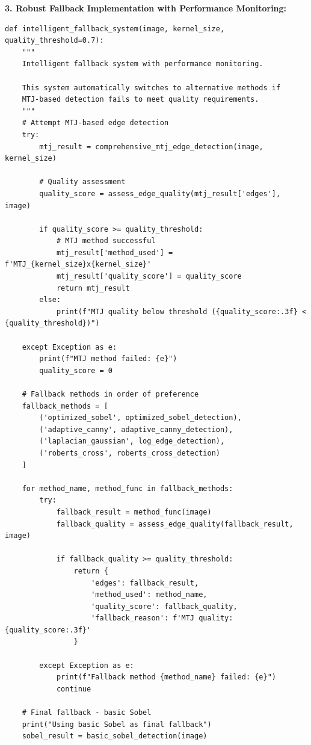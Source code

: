 \documentclass[conference]{IEEEtran}
\begin{document}
\textbf{3. Robust Fallback Implementation with Performance Monitoring:}
\begin{lstlisting}[caption={Intelligent fallback system with performance monitoring}]
def intelligent_fallback_system(image, kernel_size, quality_threshold=0.7):
    """
    Intelligent fallback system with performance monitoring.
    
    This system automatically switches to alternative methods if
    MTJ-based detection fails to meet quality requirements.
    """
    # Attempt MTJ-based edge detection
    try:
        mtj_result = comprehensive_mtj_edge_detection(image, kernel_size)
        
        # Quality assessment
        quality_score = assess_edge_quality(mtj_result['edges'], image)
        
        if quality_score >= quality_threshold:
            # MTJ method successful
            mtj_result['method_used'] = f'MTJ_{kernel_size}x{kernel_size}'
            mtj_result['quality_score'] = quality_score
            return mtj_result
        else:
            print(f"MTJ quality below threshold ({quality_score:.3f} < {quality_threshold})")
            
    except Exception as e:
        print(f"MTJ method failed: {e}")
        quality_score = 0
    
    # Fallback methods in order of preference
    fallback_methods = [
        ('optimized_sobel', optimized_sobel_detection),
        ('adaptive_canny', adaptive_canny_detection),
        ('laplacian_gaussian', log_edge_detection),
        ('roberts_cross', roberts_cross_detection)
    ]
    
    for method_name, method_func in fallback_methods:
        try:
            fallback_result = method_func(image)
            fallback_quality = assess_edge_quality(fallback_result, image)
            
            if fallback_quality >= quality_threshold:
                return {
                    'edges': fallback_result,
                    'method_used': method_name,
                    'quality_score': fallback_quality,
                    'fallback_reason': f'MTJ quality: {quality_score:.3f}'
                }
                
        except Exception as e:
            print(f"Fallback method {method_name} failed: {e}")
            continue
    
    # Final fallback - basic Sobel
    print("Using basic Sobel as final fallback")
    sobel_result = basic_sobel_detection(image)
    

\end{lstlisting}
\end{document}
